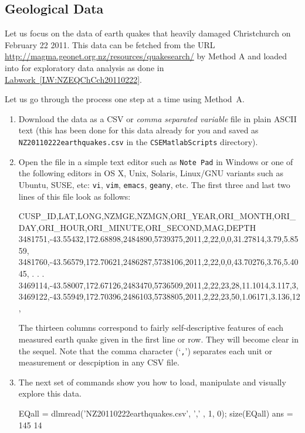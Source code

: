 \subsection{Geological Data}
 Let us focus on the data of earth quakes that heavily damaged Christchurch on February 22 2011.  This data can be fetched from the URL \href{http://magma.geonet.org.nz/resources/quakesearch/}{\url{http://magma.geonet.org.nz/resources/quakesearch/}} by {\sf Method A} and loaded into \Matlab for exploratory data analysis as done in \hyperref[LW:NZEQChCch20110222]{Labwork~\ref*{LW:NZEQChCch20110222}}.

 \begin{labwork}\label{LW:NZEQChCch20110222}
Let us go through the process one step at a time using {\sf Method~A}.
\begin{enumerate}
\item Download the data as a CSV or {\em comma separated variable} file in plain ASCII text (this has been done for this data already for you and saved as {\tt NZ20110222earthquakes.csv} in the {\tt CSEMatlabScripts} directory).
\item Open the file in a simple text editor such as {\tt Note Pad} in Windows or one of the following editors in OS X, Unix, Solaris, Linux/GNU variants such as Ubuntu, SUSE, etc: {\tt vi}, {\tt vim}, {\tt emacs}, {\tt geany}, etc.  The first three and last two lines of this file look as follows:
\begin{VrbM}
CUSP_ID,LAT,LONG,NZMGE,NZMGN,ORI_YEAR,ORI_MONTH,ORI_DAY,ORI_HOUR,ORI_MINUTE,ORI_SECOND,MAG,DEPTH
3481751,-43.55432,172.68898,2484890,5739375,2011,2,22,0,0,31.27814,3.79,5.8559,
3481760,-43.56579,172.70621,2486287,5738106,2011,2,22,0,0,43.70276,3.76,5.4045,
.
.
.
3469114,-43.58007,172.67126,2483470,5736509,2011,2,22,23,28,11.1014,3.117,3,
3469122,-43.55949,172.70396,2486103,5738805,2011,2,22,23,50,1.06171,3.136,12,
\end{VrbM}
The thirteen columns correspond to fairly self-descriptive features of each measured earth quake given in the first line or row.  They will become clear in the sequel.  Note that the comma character (`{\tt ,}') separates each unit or measurement or descpiption in any CSV file.

\item The next set of commands show you how to load,  manipulate and visually explore this data.

\begin{VrbM}
%
EQall = dlmread('NZ20110222earthquakes.csv', ',' , 1, 0);
size(EQall) %
ans =
   145    14
\end{VrbM}


\end{enumerate}
\end{labwork}

